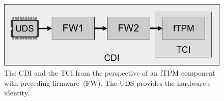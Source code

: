 \begin{figure}[htpb]
  \centering
  \includegraphics[width=0.6\linewidth]{figures/identities.pdf}
  \caption{The \ac{CDI} and the \ac{TCI} from the perspective of an \ac{fTPM} component with preceding firmware~(FW). The \ac{UDS} provides the hardware's identity.}\label{fig:identities}
\end{figure}
